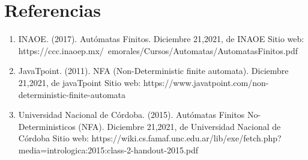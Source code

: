 \documentclass{article}
\begin{document}
	\section*{Referencias}
	\begin{enumerate}
		\item INAOE. (2017). Autómatas Finitos. Diciembre 21,2021, de INAOE Sitio web: https://ccc.inaoep.mx/~emorales/Cursos/Automatas/AutomatasFinitos.pdf
		\item JavaTpoint. (2011). NFA (Non-Deterministic finite automata). Diciembre 21,2021, de javaTpoint Sitio web: https://www.javatpoint.com/non-deterministic-finite-automata
		\item Universidad Nacional de Córdoba. (2015). Autómatas Finitos No-Deterministicos (NFA). Diciembre 21,2021, de Universidad Nacional de Córdoba Sitio web: https://wiki.cs.famaf.unc.edu.ar/lib/exe/fetch.php?media=intrologica:2015:class-2-handout-2015.pdf		
	\end{enumerate}
	
\end{document}
